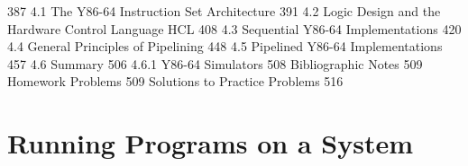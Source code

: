 \documentclass{memoir}
\begin{document}
387
4.1 The Y86-64 Instruction Set Architecture 391
4.2 Logic Design and the Hardware Control Language HCL 408
4.3 Sequential Y86-64 Implementations 420
4.4 General Principles of Pipelining 448
4.5 Pipelined Y86-64 Implementations 457
4.6 Summary 506
4.6.1 Y86-64 Simulators 508
Bibliographic Notes 509
Homework Problems 509
Solutions to Practice Problems 516




\chapter{}


\part{ Running Programs on a System}







\end{document}

